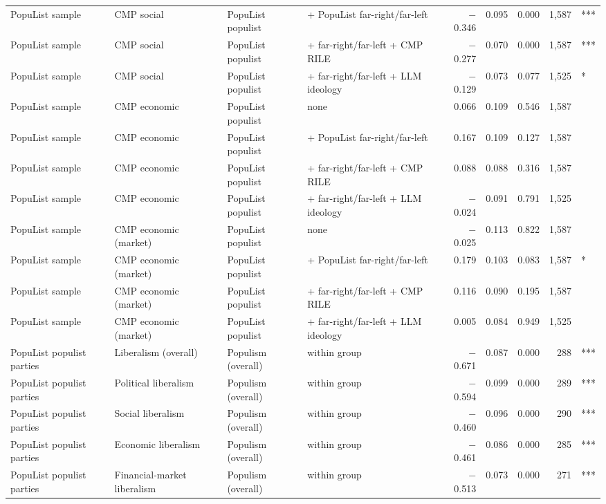 \begin{table}[ht]
{\begin{tabular}{llllrrrrl}
PopuList sample & CMP social & PopuList populist & + PopuList far-right/far-left & $-$0.346 & 0.095 & 0.000 & 1,587 & *** \\
PopuList sample & CMP social & PopuList populist & + far-right/far-left + CMP RILE & $-$0.277 & 0.070 & 0.000 & 1,587 & *** \\
PopuList sample & CMP social & PopuList populist & + far-right/far-left + LLM ideology & $-$0.129 & 0.073 & 0.077 & 1,525 & * \\
PopuList sample & CMP economic & PopuList populist & none & 0.066 & 0.109 & 0.546 & 1,587 &  \\
PopuList sample & CMP economic & PopuList populist & + PopuList far-right/far-left & 0.167 & 0.109 & 0.127 & 1,587 &  \\
PopuList sample & CMP economic & PopuList populist & + far-right/far-left + CMP RILE & 0.088 & 0.088 & 0.316 & 1,587 &  \\
PopuList sample & CMP economic & PopuList populist & + far-right/far-left + LLM ideology & $-$0.024 & 0.091 & 0.791 & 1,525 &  \\
PopuList sample & CMP economic (market) & PopuList populist & none & $-$0.025 & 0.113 & 0.822 & 1,587 &  \\
PopuList sample & CMP economic (market) & PopuList populist & + PopuList far-right/far-left & 0.179 & 0.103 & 0.083 & 1,587 & * \\
PopuList sample & CMP economic (market) & PopuList populist & + far-right/far-left + CMP RILE & 0.116 & 0.090 & 0.195 & 1,587 &  \\
PopuList sample & CMP economic (market) & PopuList populist & + far-right/far-left + LLM ideology & 0.005 & 0.084 & 0.949 & 1,525 &  \\
PopuList populist parties & Liberalism (overall) & Populism (overall) & within group & $-$0.671 & 0.087 & 0.000 & 288 & *** \\
PopuList populist parties & Political liberalism & Populism (overall) & within group & $-$0.594 & 0.099 & 0.000 & 289 & *** \\
PopuList populist parties & Social liberalism & Populism (overall) & within group & $-$0.460 & 0.096 & 0.000 & 290 & *** \\
PopuList populist parties & Economic liberalism & Populism (overall) & within group & $-$0.461 & 0.086 & 0.000 & 285 & *** \\
PopuList populist parties & Financial-market liberalism & Populism (overall) & within group & $-$0.513 & 0.073 & 0.000 & 271 & *** \\

\end{tabular}}
\end{table}
